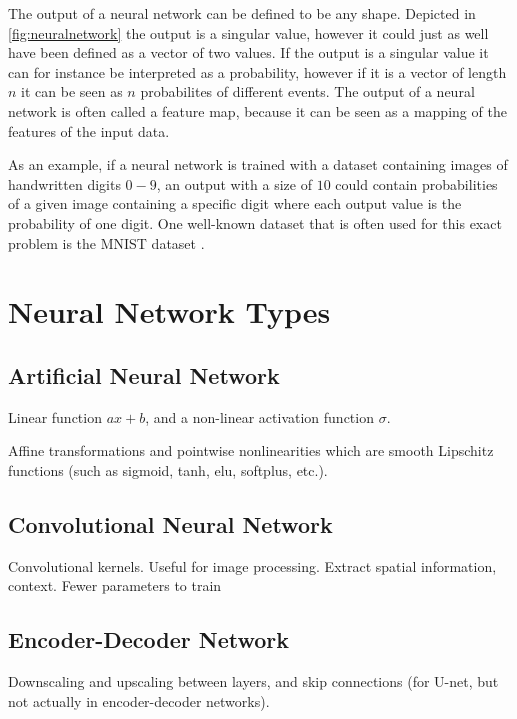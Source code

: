 The output of a neural network can be defined to be any shape. Depicted in \cref{fig:neuralnetwork} the output is a singular value, however it could just as well have been defined as a vector of two values. If the output is a singular value it can for instance be interpreted as a probability, however if it is a vector of length $n$ it can be seen as $n$ probabilites of different events. The output of a neural network is often called a feature map, because it can be seen as a mapping of the features of the input data. 

As an example, if a neural network is trained with a dataset containing images of handwritten digits $0-9$, an output with a size of $10$ could contain probabilities of a given image containing a specific digit where each output value is the probability of one digit. One well-known dataset that is often used for this exact problem is the MNIST dataset \cite{mnist}.



\section{Neural Network Types}


\subsection{Artificial Neural Network}
Linear function $ax+b$, and a non-linear activation function $\sigma$. 

Affine transformations and pointwise nonlinearities which are smooth Lipschitz functions (such as sigmoid, tanh, elu, softplus, etc.). 

\subsection{Convolutional Neural Network}
Convolutional kernels. Useful for image processing. Extract spatial information, context. Fewer parameters to train

\subsection{Encoder-Decoder Network}
Downscaling and upscaling between layers, and skip connections (for U-net, but not actually in encoder-decoder networks). %


